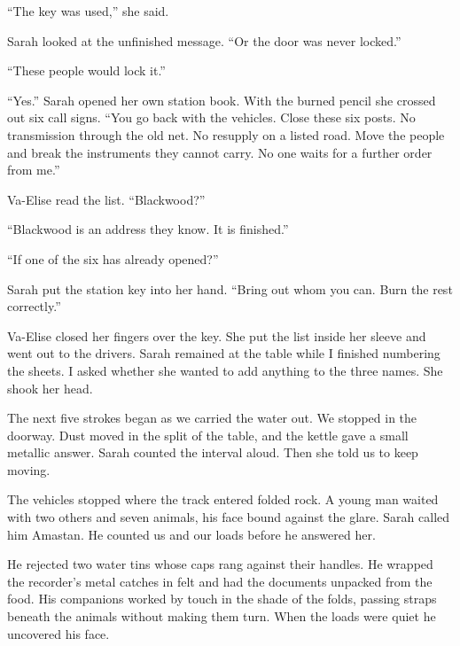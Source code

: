 ``The key was used,'' she said.\par

Sarah looked at the unfinished message. ``Or the door was never locked.''\par

``These people would lock it.''\par

``Yes.'' Sarah opened her own station book. With the burned pencil she crossed out six call signs. ``You go back with the vehicles. Close these six posts. No transmission through the old net. No resupply on a listed road. Move the people and break the instruments they cannot carry. No one waits for a further order from me.''\par

Va-Elise read the list. ``Blackwood?''\par

``Blackwood is an address they know. It is finished.''\par

``If one of the six has already opened?''\par

Sarah put the station key into her hand. ``Bring out whom you can. Burn the rest correctly.''\par

Va-Elise closed her fingers over the key. She put the list inside her sleeve and went out to the drivers. Sarah remained at the table while I finished numbering the sheets. I asked whether she wanted to add anything to the three names. She shook her head.\par

The next five strokes began as we carried the water out. We stopped in the doorway. Dust moved in the split of the table, and the kettle gave a small metallic answer. Sarah counted the interval aloud. Then she told us to keep moving.\par

\ornament

The vehicles stopped where the track entered folded rock. A young man waited with two others and seven animals, his face bound against the glare. Sarah called him Amastan. He counted us and our loads before he answered her.\par

He rejected two water tins whose caps rang against their handles. He wrapped the recorder's metal catches in felt and had the documents unpacked from the food. His companions worked by touch in the shade of the folds, passing straps beneath the animals without making them turn. When the loads were quiet he uncovered his face.\par


